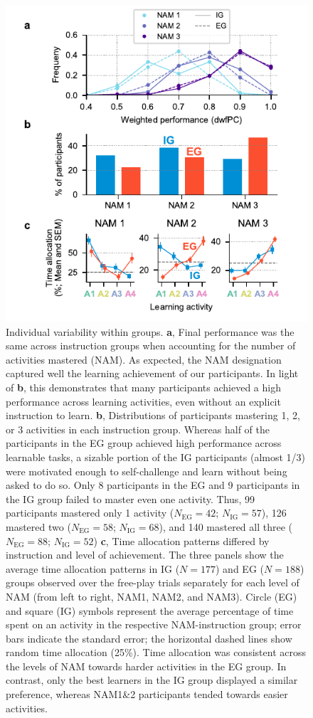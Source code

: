 \begin{figure}[tbh!]
    \centering
    \includegraphics[width=.75\columnwidth]{Figures/c4/figure3.pdf}
    \caption[short description]{Individual variability within groups. \textbf{a}, Final performance was the same across instruction groups when accounting for the number of activities mastered (\ac{NAM}). As expected, the \ac{NAM} designation captured well the learning achievement of our participants. In light of \textbf{b}, this demonstrates that many participants achieved a high performance across learning activities, even without an explicit instruction to learn. \textbf{b}, Distributions of participants mastering 1, 2, or 3 activities in each instruction group. Whereas half of the participants in the \ac{EG} group achieved high performance across learnable tasks, a sizable portion of the \ac{IG} participants (almost 1/3) were motivated enough to self-challenge and learn without being asked to do so. Only 8 participants in the \ac{EG} and 9 participants in the \ac{IG} group failed to master even one activity. Thus, 99 participants mastered only 1 activity ($N_{\mathrm{EG}}=42$; $N_{\mathrm{IG}}=57$), 126 mastered two ($N_{\mathrm{EG}}=58$; $N_{\mathrm{IG}}=68$), and 140 mastered all three ($N_{\mathrm{EG}}=88$; $N_{\mathrm{IG}}=52$) \textbf{c}, Time allocation patterns differed by instruction and level of achievement. The three panels show the average time allocation patterns in \ac{IG} ($N=177$) and \ac{EG} ($N=188$) groups observed over the free-play trials separately for each level of \ac{NAM} (from left to right, \ac{NAM}1, \ac{NAM}2, and \ac{NAM}3). Circle (\ac{EG}) and square (\ac{IG}) symbols represent the average percentage of time spent on an activity in the respective \ac{NAM}-instruction group; error bars indicate the standard error; the horizontal dashed lines show random time allocation (25\%). Time allocation was consistent across the levels of \ac{NAM} towards harder activities in the \ac{EG} group. In contrast, only the best learners in the \ac{IG} group displayed a similar preference, whereas \ac{NAM}1\&2 participants tended towards easier activities.}
    \label{fig:CH4_3}
\end{figure}

